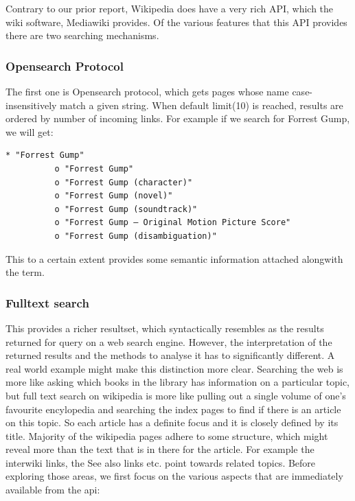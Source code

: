 \documentclass[11pt]{article}
\begin{document}

\label{March9to29}
Contrary to our prior report, Wikipedia does have a very rich API, which the wiki software, Mediawiki provides. Of the various features that this API provides there are two searching mechanisms. 

\subsubsection{Opensearch Protocol}
The first one is Opensearch protocol, which gets pages whose name case-insensitively match a given string. When default limit(10) is reached, results are ordered by number of incoming links. For example if we search for Forrest Gump, we will get:

\begin{lstlisting}[label=Opensearch Protocol, caption=Result using Opensearch]
    * "Forrest Gump"
          o "Forrest Gump"
          o "Forrest Gump (character)"
          o "Forrest Gump (novel)"
          o "Forrest Gump (soundtrack)"
          o "Forrest Gump – Original Motion Picture Score"
          o "Forrest Gump (disambiguation)"

\end{lstlisting}

This to a certain extent provides some semantic information attached alongwith the term.

\subsubsection{Fulltext search}
This provides a richer resultset, which syntactically resembles as the results returned for query on a web search engine. However, the interpretation of the returned results and the methods to analyse it has to significantly different. A real world example might make this distinction more clear. Searching the web is more like asking which books in the library has information on a particular topic, but full text search on wikipedia is more like pulling out a single volume of one's favourite encylopedia and searching the index pages to find if there is an article on this topic. So each article has a definite focus and it is closely defined by its title. Majority of the wikipedia pages adhere to some structure, which might reveal more than the text that is in there for the article. For example the interwiki links, the See also links etc. point towards related topics. Before exploring those areas, we first focus on the various aspects that are immediately available from the api:
\end{document}
